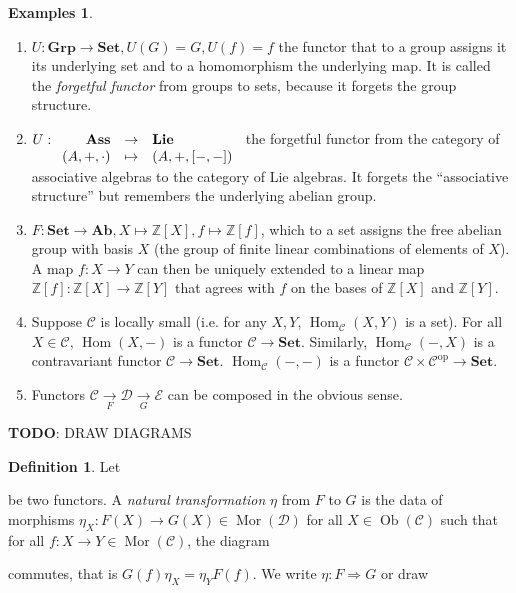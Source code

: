 \documentclass{article}
\newcommand{\op}{\mathrm{op}}
\newcommand{\Z}{\mathbb{Z}}
\newcommand{\cat}{\mathcal{C}}
\newcommand{\catt}{\mathcal{D}}
\newcommand{\Set}{\mathbf{Set}}
\newcommand{\Grp}{\mathbf{Grp}}
\newcommand{\Ab}{\mathbf{Ab}}
\DeclareMathOperator{\Ob}{Ob}
\DeclareMathOperator{\Mor}{Mor}
\DeclareMathOperator{\Hom}{Hom}
\newcommand{\todo}{\textbf{TODO}}
\newcommand{\applic}[4]{\begin{array}[t]{rcl}
#1 & \to & #2 \\
#3 & \mapsto & #4
\end{array}}
\theoremstyle{plain}
\theoremstyle{definition}
\newtheorem{definition}[theorem]{Definition}
\newtheorem{examples}[theorem]{Examples}
\theoremstyle{remark}
\begin{document}
\begin{examples} \leavevmode
    \begin{enumerate}
        \item $U : \Grp \to \Set, U(G) = G, U(f) = f$ the functor that to a group assigns it its underlying set and to a homomorphism the underlying map. It is called the \emph{forgetful functor} from groups to sets, because it forgets the group structure.
        \item $U : \applic{\mathbf{Ass}}{\mathbf{Lie}}{(A,+,\cdot)}{(A,+,[-,-])}$ the forgetful functor from the category of associative algebras to the category of Lie algebras. It forgets the ``associative structure'' but remembers the underlying abelian group.
        \item $F : \Set \to \Ab, X \mapsto \Z[X], f \mapsto \Z[f]$, which to a set assigns the free abelian group with basis $X$ (the group of finite linear combinations of elements of $X$). A map $f : X \to Y$ can then be uniquely extended to a linear map $\Z[f] : \Z[X] \to \Z[Y]$ that agrees with $f$ on the bases of $\Z[X]$ and $\Z[Y]$.
        \item Suppose $\cat$ is locally small (i.e. for any $X,Y$, $\Hom_\cat(X,Y)$ is a set). For all $X \in \cat$, $\Hom(X,-)$ is a functor $\cat \to \Set$. Similarly, $\Hom_\cat(-,X)$ is a contravariant functor $\cat \to \Set$. $\Hom_\cat(-,-)$ is a functor $\cat \times \cat^\op \to \Set$.
        \item Functors $\cat \xrightarrow[F]{} \catt \xrightarrow[G]{} \mathcal{E}$ can be composed in the obvious sense.
    \end{enumerate}
\end{examples}

\todo : DRAW DIAGRAMS

\begin{definition}
    Let  be two functors. A \emph{natural transformation} $\eta$ from $F$ to $G$ is the data of morphisms $\eta_X : F(X) \to G(X) \in \Mor(\catt)$ for all $X \in \Ob(\cat)$ such that for all $f : X \to Y \in \Mor(\cat)$, the diagram
    \begin{center}
    \end{center}
    commutes, that is $G(f)\eta_X = \eta_Y F(f)$. We write $\eta : F \Rightarrow G$ or draw 
\end{definition}
\end{document}
